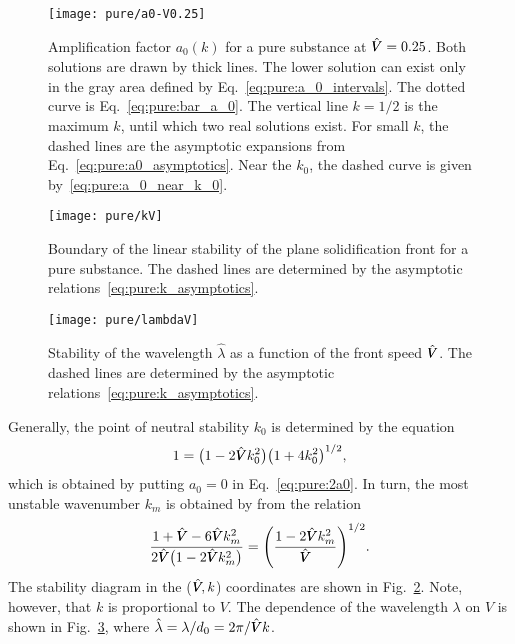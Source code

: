 \documentclass{article}
\newcommand{\hV}[1][\qty(\bar{V})]{\vphantom{#1}\mathrlap{\smash{\hat{V}}}V}
\begin{document}
\begin{figure}
    \centering
    \texttt{[image: pure/a0-V0.25]}
    \caption{
        Amplification factor $a_0(k)$ for a pure substance at $\hV=0.25$.
        Both solutions are drawn by thick lines.
        The lower solution can exist only in the gray area defined by Eq.~\eqref{eq:pure:a_0_intervals}.
        The dotted curve is Eq.~\eqref{eq:pure:bar_a_0}.
        The vertical line $k=1/2$ is the maximum $k$, until which two real solutions exist.
        For small $k$, the dashed lines are the asymptotic expansions from Eq.~\eqref{eq:pure:a0_asymptotics}.
        Near the $k_0$, the dashed curve is given by~\eqref{eq:pure:a_0_near_k_0}.
    }\label{fig:pure:a0}
\end{figure}

\begin{figure}
    \centering
    \texttt{[image: pure/kV]}
    \caption{
        Boundary of the linear stability of the plane solidification front for a pure substance.
        The dashed lines are determined by the asymptotic relations~\eqref{eq:pure:k_asymptotics}.
    }\label{fig:pure:kV}
\end{figure}

\begin{figure}
    \centering
    \texttt{[image: pure/lambdaV]}
    \caption{
        Stability of the wavelength $\hat\lambda$ as a function of the front speed $\hV$.
        The dashed lines are determined by the asymptotic relations~\eqref{eq:pure:k_asymptotics}.
    }\label{fig:pure:lambdaV}
\end{figure}

Generally, the point of neutral stability $k_0$ is determined by the equation
\begin{equation}\label{eq:pure:marginal}
    1 = \qty(1-2\hV k_0^2)\qty(1+4k_0^2)^{1/2},
\end{equation}
which is obtained by putting $a_0=0$ in Eq.~\eqref{eq:pure:2a0}.
In turn, the most unstable wavenumber $k_m$ is obtained by from the relation
\begin{equation}\label{eq:pure:most}
    \frac{1+\hV-6\hV k_m^2}{2\hV\qty(1-2\hV k_m^2)} = \qty(\frac{1-2\hV k_m^2}{\hV})^{1/2}.
\end{equation}
The stability diagram in the ($\hV,k$) coordinates are shown in Fig.~\ref{fig:pure:kV}.
Note, however, that $k$ is proportional to $V$.
The dependence of the wavelength $\lambda$ on $V$ is shown in Fig.~\ref{fig:pure:lambdaV},
where $\hat\lambda = \lambda/d_0 = 2\pi/\hV k$.
\end{document}
